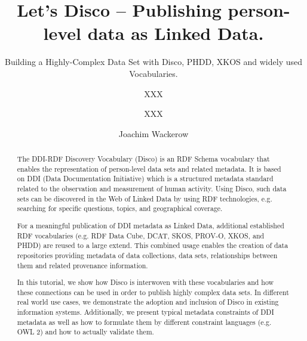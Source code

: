 \documentclass{llncs}
\begin{document}
%
%
\title{Let’s Disco – Publishing person-level data as Linked Data.}
\subtitle{Building a Highly-Complex Data Set with Disco, PHDD, XKOS and widely used Vocabularies.
}
%
%
\author{XXX \and XXX \and Joachim Wackerow}
%
%

\maketitle              %

\begin{abstract}
The DDI-RDF Discovery Vocabulary (Disco) is an RDF Schema vocabulary that enables the representation of person-level data sets and related metadata.
It is based on DDI (Data Documentation Initiative) which is a structured metadata standard related to the observation and measurement of human activity.
Using Disco, such data sets can be discovered in the Web of Linked Data by using RDF technologies, e.g. searching for specific questions, topics, and geographical coverage. 

For a meaningful publication of DDI metadata as Linked Data, additional established RDF vocabularies (e.g. RDF Data Cube, DCAT, SKOS, PROV-O, XKOS, and PHDD) are reused to a large extend. 
This combined usage enables the creation of data repositories providing metadata of data collections, data sets, relationships between them and related provenance information.
 
In this tutorial, we show how Disco is interwoven with these vocabularies and how these connections can be used in order to publish highly complex data sets.
In different real world use cases, we demonstrate the adoption and inclusion of Disco in existing information systems. 
Additionally, we present typical metadata constraints of DDI metadata as well as how to formulate them by different constraint languages (e.g. OWL 2) and how to actually validate them.

 

\end{abstract}
%
\end{document}
